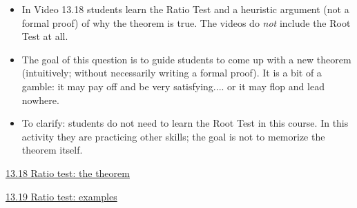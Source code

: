 \documentclass[11pt]{article}
\newcommand{\nl}{\hfill \vspace{-1.1\baselineskip}} %
\newcommand{\vxviii}{\hspace{8mm} \href{https://www.youtube.com/watch?v=2Fj56wxfLEo&list=PLlwePzQY_wW-FJMnD_ybkXU_jZLVtZttI&index=18}{13.18 Ratio test: the theorem} }
\newcommand{\vxix}{\hspace{8mm} \href{https://www.youtube.com/watch?v=S0C0XoEKGCk&list=PLlwePzQY_wW-FJMnD_ybkXU_jZLVtZttI&index=19}{13.19 Ratio test: examples} }
\begin{document}
\begin{comments}
\nl
	\begin{itemize}
		\item   In Video 13.18 students learn the Ratio Test and a heuristic argument (not a formal proof) of why the theorem is true.  The videos do \emph{not} include the Root Test at all.  
		\item The goal of this question is to guide students to come up with a new theorem (intuitively; without necessarily writing a formal proof).    It is a bit of a gamble: it may pay off and be very satisfying.... or it may flop and lead nowhere.
		\item To clarify: students do not need to learn the Root Test in this course.   In this activity they are practicing other skills; the goal is not to memorize the theorem itself.
	\end{itemize}
\end{comments}

\begin{videos}
\vxviii

\vxix
\end{videos}

\newpage
\end{document}
